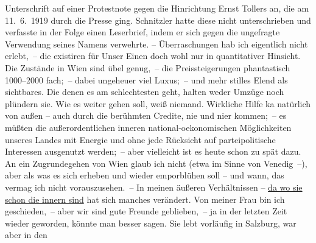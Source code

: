 \begin{ledgroupsized}[t]{13cm}
{{{                  Unterschrift auf einer Protestnote gegen die Hinrichtung Ernst
                     Tollers an, die am 11. 6. 1919 durch die Presse ging. Schnitzler hatte diese nicht unterschrieben und
                  verfasste in der Folge einen Leserbrief, indem er sich gegen die ungefragte
                  Verwendung seines Namens verwehrte.}}}\label{K_L02376_3h} – Überraschungen hab ich eigentlich
               nicht erlebt, – die existiren für Unser Einen doch wohl nur in quantitativer
               Hinsicht.\pend
           \pstart
           Die Zustände in Wien sind übel genug, – die
               Preissteigerungen phantastisch 1000–2000 fach; – dabei ungeheuer viel Luxus; – und
               mehr stilles Elend als sichtbares. Die denen es am schlechtesten geht, halten weder
               Umzüge noch plündern sie. Wie es weiter gehen soll, weiß niemand. Wirkliche {\pb}Hilfe ka{\geminationn} natürlich
               von außen – auch durch die berühmten Credite, nie und ni{\geminationm}er kommen; – es müßten die außerordentlichen inneren \introOben{}national-\introOben{}oekonomischen Möglichkeiten unseres Landes mit Energie und ohne
               jede Rücksicht auf \introOben{}partei\introOben{}politische  Interessen ausgenutzt werden; – aber vielleicht ist
               es heute schon zu spät dazu. An ein Zugrundegehen von Wien glaub ich nicht (etwa im Sinne von Venedig –), aber als was es sich erheben und wieder emporblühen soll – und
               wann, das vermag ich nicht vorauszusehen. –\pend
           \pstart
           In meinen äußeren Verhältnissen – \uline{da wo sie schon die
                  innern sind} hat sich manches verändert. Von meiner Frau bin ich geschieden, – aber wir sind gute
               Freunde geblieben, – ja in der letzten Zeit wieder geworden, könnte man besser sagen.
               Sie lebt vorläufig in Salzburg, war aber in den

\end{ledgroupsized}
